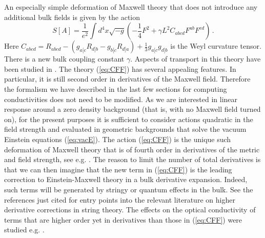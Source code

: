 \documentclass[10pt, oneside]{book}
\def\be{\begin{equation}}
\def\ee{\end{equation}}
\begin{document}
\begin{doublespace}
An especially simple deformation of Maxwell theory that does not introduce any additional bulk fields is given by the action
\be\label{eq:CFF}
S[A] = \frac{1}{e^2} \int d^4x \sqrt{-g} \left( - \frac{1}{4} F^2 + \gamma L^2 C_{abcd} F^{ab} F^{cd} \right) \,.
\ee
Here $C_{abcd} = R_{abcd} - (g_{a[c}R_{d]b} - g_{b[c} R_{d]a}) + \frac{1}{3} g_{a[c}g_{d]b}$ is the Weyl curvature tensor. There is a new bulk coupling constant $\gamma$.
Aspects of transport in this theory have been studied in \cite{Ritz:2008kh, Myers:2010pk, WitczakKrempa:2012gn, Chowdhury:2012km, Witczak-Krempa:2013nua}. The theory (\ref{eq:CFF}) has several appealing features. In particular, it is still second order in derivatives of the Maxwell field. Therefore the formalism we have described in the last few sections for computing conductivities does not need to be modified. As we are interested in linear response around a zero density background (that is, with no Maxwell field turned on), for the present purposes it is sufficient to consider actions quadratic in the field strength and evaluated in geometric backgrounds that solve the vacuum Einstein equations (\ref{eq:vacE}). The action (\ref{eq:CFF}) is the unique such deformation of Maxwell theory that is of fourth order in derivatives of the metric and field strength, see e.g. \cite{Myers:2010pk,Chowdhury:2012km}. The reason to limit the number of total derivatives is that we can then imagine that the new term in (\ref{eq:CFF}) is the leading correction to Einstein-Maxwell theory in a bulk derivative expansion. Indeed, such terms will be generated by stringy or quantum effects in the bulk. See the references just cited for entry points into the relevant literature on higher derivative corrections in string theory. The effects on the optical conductivity of terms that are higher order yet in derivatives than those in (\ref{eq:CFF}) were studied e.g. \cite{Witczak-Krempa:2013aea, Bai:2013tfa}.


\end{doublespace}
\end{document}

